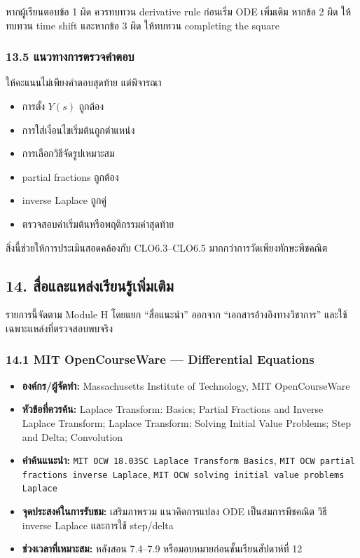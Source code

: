 หากผู้เรียนตอบข้อ 1 ผิด ควรทบทวน derivative rule ก่อนเริ่ม ODE เพิ่มเติม หากข้อ 2 ผิด ให้ทบทวน time shift และหากข้อ 3 ผิด ให้ทบทวน completing the square

\subsubsection{13.5 แนวทางการตรวจคำตอบ}

ให้คะแนนไม่เพียงคำตอบสุดท้าย แต่พิจารณา

\begin{itemize}
    \item การตั้ง $Y(s)$ ถูกต้อง
    \item การใส่เงื่อนไขเริ่มต้นถูกตำแหน่ง
    \item การเลือกวิธีจัดรูปเหมาะสม
    \item partial fractions ถูกต้อง
    \item inverse Laplace ถูกคู่
    \item ตรวจสอบค่าเริ่มต้นหรือพฤติกรรมค่าสุดท้าย
\end{itemize}

สิ่งนี้ช่วยให้การประเมินสอดคล้องกับ CLO6.3–CLO6.5 มากกว่าการวัดเพียงทักษะพีชคณิต



\subsection{14. สื่อและแหล่งเรียนรู้เพิ่มเติม}

รายการนี้จัดตาม Module H โดยแยก “สื่อแนะนำ” ออกจาก “เอกสารอ้างอิงทางวิชาการ” และใช้เฉพาะแหล่งที่ตรวจสอบพบจริง

\subsubsection{14.1 MIT OpenCourseWare — Differential Equations}

\begin{itemize}
    \item \textbf{องค์กร/ผู้จัดทำ:} Massachusetts Institute of Technology, MIT OpenCourseWare
    \item \textbf{หัวข้อที่ควรค้น:} Laplace Transform: Basics; Partial Fractions and Inverse Laplace Transform; Laplace Transform: Solving Initial Value Problems; Step and Delta; Convolution
    \item \textbf{คำค้นแนะนำ:} \texttt{MIT OCW 18.03SC Laplace Transform Basics}, \texttt{MIT OCW partial fractions inverse Laplace}, \texttt{MIT OCW solving initial value problems Laplace}
    \item \textbf{จุดประสงค์ในการรับชม:} เสริมภาพรวม แนวคิดการแปลง ODE เป็นสมการพีชคณิต วิธี inverse Laplace และการใช้ step/delta
    \item \textbf{ช่วงเวลาที่เหมาะสม:} หลังสอน 7.4–7.9 หรือมอบหมายก่อนชั้นเรียนสัปดาห์ที่ 12
\end{itemize}

